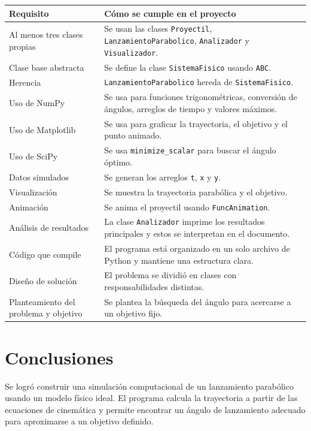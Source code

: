 \documentclass[12pt,letterpaper]{article}
\begin{document}
\begin{longtable}{p{5.5cm}p{9cm}}
\toprule
\textbf{Requisito} & \textbf{C\'{o}mo se cumple en el proyecto} \\
\midrule
Al menos tres clases propias & Se usan las clases \texttt{Proyectil}, \texttt{LanzamientoParabolico}, \texttt{Analizador} y \texttt{Visualizador}. \\
Clase base abstracta & Se define la clase \texttt{SistemaFisico} usando \texttt{ABC}. \\
Herencia & \texttt{LanzamientoParabolico} hereda de \texttt{SistemaFisico}. \\
Uso de NumPy & Se usa para funciones trigonom\'{e}tricas, conversi\'{o}n de \'{a}ngulos, arreglos de tiempo y valores m\'{a}ximos. \\
Uso de Matplotlib & Se usa para graficar la trayectoria, el objetivo y el punto animado. \\
Uso de SciPy & Se usa \texttt{minimize\_scalar} para buscar el \'{a}ngulo \'{o}ptimo. \\
Datos simulados & Se generan los arreglos \texttt{t}, \texttt{x} y \texttt{y}. \\
Visualizaci\'{o}n & Se muestra la trayectoria parab\'{o}lica y el objetivo. \\
Animaci\'{o}n & Se anima el proyectil usando \texttt{FuncAnimation}. \\
An\'{a}lisis de resultados & La clase \texttt{Analizador} imprime los resultados principales y estos se interpretan en el documento. \\
C\'{o}digo que compile & El programa est\'{a} organizado en un solo archivo de Python y mantiene una estructura clara. \\
Dise\~{n}o de soluci\'{o}n & El problema se dividi\'{o} en clases con responsabilidades distintas. \\
Planteamiento del problema y objetivo & Se plantea la b\'{u}squeda del \'{a}ngulo para acercarse a un objetivo fijo. \\
\bottomrule
\end{longtable}

\section{Conclusiones}

Se logr\'{o} construir una simulaci\'{o}n computacional de un lanzamiento parab\'{o}lico usando un modelo f\'{i}sico ideal. El programa calcula la trayectoria a partir de las ecuaciones de cinem\'{a}tica y permite encontrar un \'{a}ngulo de lanzamiento adecuado para aproximarse a un objetivo definido.
\end{document}
